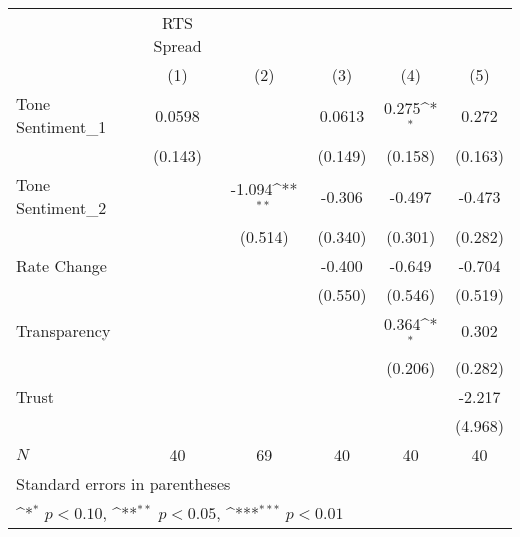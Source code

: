 {
\def\sym#1{\ifmmode^{#1}\else\(^{#1}\)\fi}
\begin{tabular}{l*{5}{c}}
\hline\hline
            &  RTS Spread         &                     &                     &                     &                     \\
            &\multicolumn{1}{c}{(1)}         &\multicolumn{1}{c}{(2)}         &\multicolumn{1}{c}{(3)}         &\multicolumn{1}{c}{(4)}         &\multicolumn{1}{c}{(5)}         \\
\hline
Tone Sentiment\_{1}&      0.0598         &                     &      0.0613         &       0.275\sym{*}  &       0.272         \\
            &     (0.143)         &                     &     (0.149)         &     (0.158)         &     (0.163)         \\
[1em]
Tone Sentiment\_{2}&                     &      -1.094\sym{**} &      -0.306         &      -0.497         &      -0.473         \\
            &                     &     (0.514)         &     (0.340)         &     (0.301)         &     (0.282)         \\
[1em]
Rate Change &                     &                     &      -0.400         &      -0.649         &      -0.704         \\
            &                     &                     &     (0.550)         &     (0.546)         &     (0.519)         \\
[1em]
Transparency&                     &                     &                     &       0.364\sym{*}  &       0.302         \\
            &                     &                     &                     &     (0.206)         &     (0.282)         \\
[1em]
Trust       &                     &                     &                     &                     &      -2.217         \\
            &                     &                     &                     &                     &     (4.968)         \\
\hline
\(N\)       &          40         &          69         &          40         &          40         &          40         \\
\hline\hline
\multicolumn{6}{l}{\footnotesize Standard errors in parentheses}\\
\multicolumn{6}{l}{\footnotesize \sym{*} \(p<0.10\), \sym{**} \(p<0.05\), \sym{***} \(p<0.01\)}\\
\end{tabular}
}
